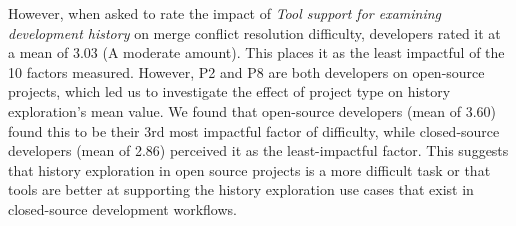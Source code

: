 However, when asked to rate the impact of \textit{Tool support for examining development history} on merge conflict resolution difficulty, developers rated it at a mean of 3.03 (A moderate amount). This places it as the least impactful of the 10 factors measured. However, P2 and P8 are both developers on open-source projects, which led us to investigate the effect of project type on history exploration's mean value. We found that open-source developers (mean of 3.60) found this to be their 3rd most impactful factor of difficulty, while closed-source developers (mean of 2.86) perceived it as the least-impactful factor. This suggests that history exploration in open source projects is a more difficult task or that tools are better at supporting the history exploration use cases that exist in closed-source development workflows.

